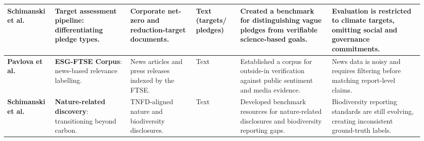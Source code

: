 \documentclass[english, online, cse, master]{dithesis}
\begin{document}
\begin{landscape}
\begin{table}[p]
\begin{tabularx}{\linewidth}{|p{1.8cm}|X|X|p{1.8cm}|X|X|}
\textbf{Schimanski et al.} \parencite{tobias_schimanski_241ada20} & \textbf{Target assessment pipeline}: differentiating pledge types. & Corporate net-zero and reduction-target documents. & Text (targets/ pledges) & Created a benchmark for distinguishing vague pledges from verifiable science-based goals. & Evaluation is restricted to climate targets, omitting social and governance commitments. \\ \hline
\textbf{Pavlova et al.} \parencite{mariya_pavlova_259be499} & \textbf{ESG-FTSE Corpus}: news-based relevance labelling. & News articles and press releases indexed by the FTSE. & Text & Established a corpus for outside-in verification against public sentiment and media evidence. & News data is noisy and requires filtering before matching report-level claims. \\ \hline
\textbf{Schimanski et al.} \parencite{tobias_schimanski_3549ff9f} & \textbf{Nature-related discovery}: transitioning beyond carbon. & TNFD-aligned nature and biodiversity disclosures. & Text & Developed benchmark resources for nature-related disclosures and biodiversity reporting gaps. & Biodiversity reporting standards are still evolving, creating inconsistent ground-truth labels. \\ \hline
\end{tabularx}
\end{table}
\end{landscape}
\end{document}
